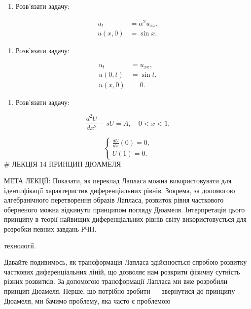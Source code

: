 \documentclass[
  ukrainian,
]{article}
\providecommand{\tightlist}{%
  \setlength{\itemsep}{0pt}\setlength{\parskip}{0pt}}
\begin{document}
\begin{enumerate}
\def\labelenumi{\arabic{enumi}.}
\setcounter{enumi}{1}
\tightlist
\item
  Розв'язати задачу:
\end{enumerate}

\[
\begin{aligned}
u_t &= \alpha^2 u_{xx}, \\
u(x,0) &= \sin x.
\end{aligned}
\]

\begin{enumerate}
\def\labelenumi{\arabic{enumi}.}
\setcounter{enumi}{2}
\tightlist
\item
  Розв'язати задачу:
\end{enumerate}

\[
\begin{aligned}
u_t &= u_{xx}, \\
u(0,t) &= \sin t, \\
u(x,0) &= 0.
\end{aligned}
\]

\begin{enumerate}
\def\labelenumi{\arabic{enumi}.}
\setcounter{enumi}{3}
\tightlist
\item
  Розв'язати задачу:
\end{enumerate}

\[
\frac{d^2U}{dx^2} - sU = A, \quad 0 < x < 1,
\]

\[
\begin{cases}
\frac{dU}{dx}(0) = 0, \\
U(1) = 0.
\end{cases}
\] \# ЛЕКЦІЯ 14 ПРИНЦИП ДЮАМЕЛЯ

МЕТА ЛЕКЦІЇ: Показати, як переклад Лапласа можна використовувати для
ідентифікації характеристик диференціальних рівнів. Зокрема, за
допомогою алгебранічного перетворення образів Лапласа, розвиток рівня
часткового оберненого можна відкинути принципом погляду Дюамеля.
Інтерпретація цього принципу в теорії найвищих диференціальних рівнів
світу використовується для розробки певних завдань РЧП.

технології.

Давайте подивимось, як трансформація Лапласа здійснюється спробою
розвитку часткових диференціальних ліній, що дозволяє нам розкрити
фізичну сутність різних розвитків. За допомогою трансформації Лапласа ми
вже розробили принцип Дюамеля. Перше, що потрібно зробити --- звернутися
до принципу Дюамеля, ми бачимо проблему, яка часто є проблемою
\end{document}
